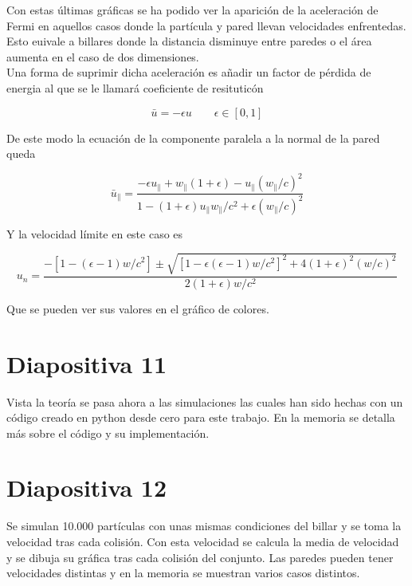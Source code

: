\documentclass[11pt, spanish]{article}
\begin{document}
Con estas últimas gráficas se ha podido ver la aparición de la aceleración de Fermi en aquellos casos donde la partícula y pared llevan velocidades enfrentedas. Esto euivale a billares donde la distancia disminuye entre paredes o el área aumenta en el caso de dos dimensiones. \\

Una forma de suprimir dicha aceleración es añadir un factor de pérdida de energia al que se le llamará coeficiente de resituticón

\begin{equation}
    \bar{u} = -\epsilon u \qquad \epsilon \in \left[ 0, 1 \right]
\end{equation}

De este modo la ecuación de la componente paralela a la normal de la pared queda

\begin{equation}
    \bar{u}_\parallel = \dfrac{-\epsilon u_\parallel + w_\parallel (1 + \epsilon) -  u_\parallel (w_\parallel/c)^2}{1 - (1 + \epsilon)u_\parallel w_\parallel/c^2 + \epsilon (w_\parallel/c)^2}
\end{equation}

Y la velocidad límite en este caso es

\begin{equation}
    u_n = \dfrac{-\left[ 1 -  (\epsilon - 1)w/c^2 \right] \pm \sqrt{\left[ 1 - \epsilon (\epsilon - 1)w/c^2 \right]^2 + 4(1+\epsilon)^2(w/c)^2}}{2(1+\epsilon)w/c^2} 
\end{equation}

Que se pueden ver sus valores en el gráfico de colores.

\section{Diapositiva 11}

Vista la teoría se pasa ahora a las simulaciones las cuales han sido hechas con un código creado en python desde cero para este trabajo. En la memoria se detalla más sobre el código y su implementación.

\section{Diapositiva 12}

Se simulan 10.000 partículas con unas mismas condiciones del billar y se toma la velocidad tras cada colisión. Con esta velocidad se calcula la media de velocidad y se dibuja su gráfica tras cada colisión del conjunto. Las paredes pueden tener velocidades distintas y en la memoria se muestran varios casos distintos. 
\end{document}
